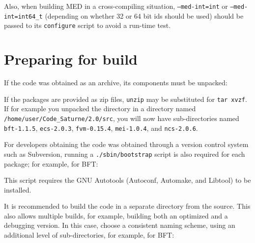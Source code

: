 \documentclass[a4paper,10pt,twoside]{article}
\begin{document}
Also, when building MED in a cross-compiling situation,
\texttt{--med-int=int} or \texttt{--med-int=int64\_t} (depending
on whether 32 or 64 bit ids should be used) should be
passed to its \texttt{configure} script to avoid a run-time
test.

\section{Preparing for build\label{sec:prepare}}

If the code was obtained as an archive, its components must be unpacked:


If the packages are provided as zip files, \texttt{unzip} may be substituted
for \texttt{tar xvzf}.
If for example you unpacked the directory in a directory
named \texttt{/home/user/Code\_Saturne/2.0/src}, you will now
have sub-directories named \texttt{bft-1.1.5}, \texttt{ecs-2.0.3},
\texttt{fvm-0.15.4}, \texttt{mei-1.0.4}, and \texttt{ncs-2.0.6}.

For developers obtaining the code was obtained through a version control
system such as Subversion, running a \texttt{./sbin/bootstrap}
script is also required for each package; for example, for BFT:


This script requires the GNU Autotools (Autoconf, Automake, and Libtool)
to be installed.

It is recommended to build the code in a separate directory from the source.
This also allows multiple builds, for example, building both an
optimized and a debugging version. In this case, choose a consistent
naming scheme, using an additional level of sub-directories,
for example, for BFT:
\end{document}
